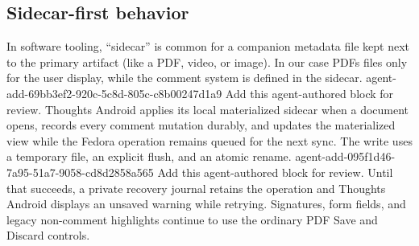 \subsection*{Sidecar-first behavior}
In software tooling, “sidecar” is common for a companion metadata file kept next to the primary artifact (like a PDF, video, or image).
In our case PDFs files only for the user display, while the comment system is defined in the sidecar.
\agentProposedEdit
  {agent-add-69bb3ef2-920c-5c8d-805c-c8b00247d1a9}
  {Add this agent-authored block for review.}
  {}
  {Thoughts Android applies its local materialized sidecar when a document opens, records every comment mutation durably, and updates the materialized view while the Fedora operation remains queued for the next sync.}
The write uses a temporary file, an explicit flush, and an atomic rename.
\agentProposedEdit
  {agent-add-095f1d46-7a95-51a7-9058-cd8d2858a565}
  {Add this agent-authored block for review.}
  {}
  {Until that succeeds, a private recovery journal retains the operation and Thoughts Android displays an unsaved warning while retrying.}
Signatures, form fields, and legacy non-comment highlights continue to use the ordinary PDF Save and Discard controls.

